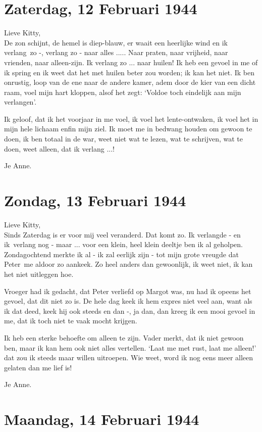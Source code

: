 \documentclass{book}
\begin{document}
\section*{Zaterdag, 12 Februari 1944}

Lieve Kitty,\\
De zon schijnt, de hemel is diep-blauw, er waait een heerlijke
wind en ik verlang~zo -, verlang zo - naar alles ..... Naar praten, naar
vrijheid, naar vrienden, naar alleen-zijn. Ik verlang zo ... naar huilen! Ik heb
een gevoel in me of ik spring en ik weet dat het met huilen beter zou worden; ik
kan het niet. Ik ben onrustig, loop van de ene naar de andere kamer, adem door
de kier van een dicht raam, voel mijn hart kloppen, alsof het zegt: `Voldoe toch
eindelijk aan mijn verlangen'.

Ik geloof, dat ik het voorjaar in me voel, ik voel het lente-ontwaken, ik voel
het in mijn hele lichaam enfin mijn ziel. Ik moet me in bedwang houden om gewoon
te doen, ik ben totaal in de war, weet niet wat te lezen, wat te schrijven, wat
te doen, weet alleen, dat ik verlang ...!

Je Anne.

\section*{Zondag, 13 Februari 1944}

Lieve Kitty,\\
Sinds Zaterdag is er voor mij veel veranderd. Dat komt zo.  Ik
verlangde - en ik~verlang nog - maar ... voor een klein, heel klein deeltje ben
ik al geholpen. Zondagochtend merkte ik al - ik zal eerlijk zijn - tot mijn
grote vreugde dat Peter~me aldoor zo aankeek. Zo heel anders dan gewoonlijk, ik
weet niet, ik kan het niet uitleggen hoe.

Vroeger had ik gedacht, dat Peter verliefd op Margot was, nu had ik opeens het
gevoel, dat dit niet zo is. De hele dag keek ik hem expres niet veel aan, want
als ik dat deed, keek hij ook steeds en dan -, ja dan, dan kreeg ik een mooi
gevoel in me, dat ik toch niet te vaak mocht krijgen.

Ik heb een sterke behoefte om alleen te zijn. Vader merkt, dat ik niet gewoon
ben, maar ik kan hem ook niet alles vertellen. `Laat me met rust, laat me
alleen!' dat zou ik steeds maar willen uitroepen. Wie weet, word ik nog eens
meer alleen gelaten dan me lief is!

Je Anne.

\section*{Maandag, 14 Februari 1944}
\end{document}

